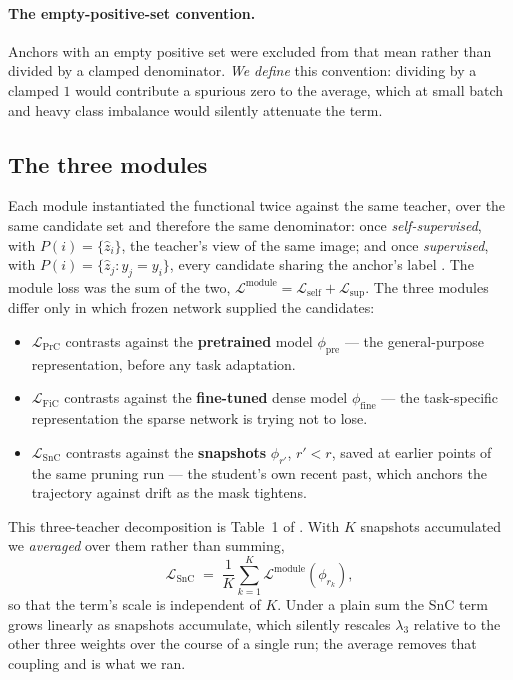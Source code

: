 \paragraph{The empty-positive-set convention.}
Anchors with an empty positive set were excluded from that mean rather than
divided by a clamped denominator. \emph{We define} this convention: dividing by a
clamped $1$ would contribute a spurious zero to the average, which at small batch
and heavy class imbalance would silently attenuate the term.

\subsection{The three modules}

Each module instantiated the functional twice against the same teacher, over the
same candidate set and therefore the same denominator: once
\emph{self-supervised}, with $P(i) = \{\hat z_i\}$, the teacher's view of the
same image; and once \emph{supervised}, with $P(i) = \{\hat z_j : y_j = y_i\}$,
every candidate sharing the anchor's label \citep{khosla2020supcon}. The module
loss was the sum of the two,
$\mathcal{L}^{\mathrm{module}} = \mathcal{L}_{\mathrm{self}} +
\mathcal{L}_{\mathrm{sup}}$. The three modules differ only in which frozen
network supplied the candidates:

\begin{itemize}
\item $\mathcal{L}_{\mathrm{PrC}}$ contrasts against the \textbf{pretrained}
  model $\phi_{\mathrm{pre}}$ --- the general-purpose representation, before any
  task adaptation.
\item $\mathcal{L}_{\mathrm{FiC}}$ contrasts against the \textbf{fine-tuned}
  dense model $\phi_{\mathrm{fine}}$ --- the task-specific representation the
  sparse network is trying not to lose.
\item $\mathcal{L}_{\mathrm{SnC}}$ contrasts against the \textbf{snapshots}
  $\phi_{r'}$, $r' < r$, saved at earlier points of the same pruning run --- the
  student's own recent past, which anchors the trajectory against drift as the
  mask tightens.
\end{itemize}

This three-teacher decomposition is Table~1 of \citet{xu2022cap}. With $K$
snapshots accumulated we \emph{averaged} over them rather than summing,
%
\begin{equation}
\label{eq:snc}
\mathcal{L}_{\mathrm{SnC}} \;=\; \frac{1}{K}\sum_{k=1}^{K}
\mathcal{L}^{\mathrm{module}}\!\left(\phi_{r_k}\right),
\end{equation}
%
so that the term's scale is independent of $K$. Under a plain sum the SnC term
grows linearly as snapshots accumulate, which silently rescales $\lambda_3$
relative to the other three weights over the course of a single run; the average
removes that coupling and is what we ran.

